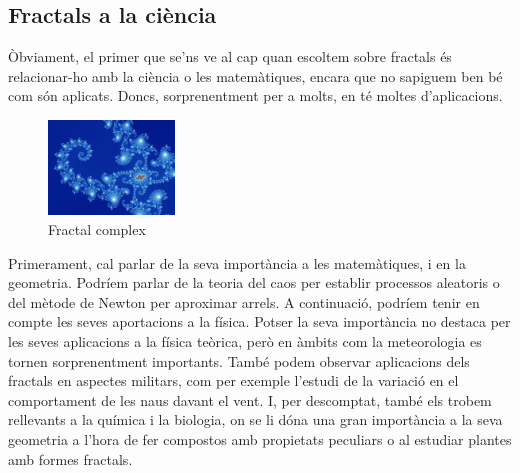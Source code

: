 \documentclass[12pt]{report}
\begin{document}
\subsection{Fractals a la ciència}
Òbviament, el primer que se'ns ve al cap quan escoltem sobre fractals és relacionar-ho amb la ciència o les matemàtiques, encara que no sapiguem ben bé com són aplicats. Doncs, sorprenentment per a molts, en té moltes d'aplicacions.
\newline
\begin{figure}
    \includegraphics[width=0.3\textwidth]{ciencia.jpg}
    \caption{Fractal complex}
    \end{figure}
Primerament, cal parlar de la seva importància a les matemàtiques, i en la geometria. Podríem parlar de la teoria del caos per establir processos aleatoris o del mètode de Newton per aproximar arrels.
\newline
A continuació, podríem tenir en compte les seves aportacions a la física. Potser la seva importància no destaca per les seves aplicacions a la física teòrica, però en àmbits com la meteorologia es tornen sorprenentment importants. També podem observar aplicacions dels fractals en aspectes militars, com per exemple l'estudi de la variació en el comportament de les naus davant el vent.
\newline
I, per descomptat, també els trobem rellevants a la química i la biologia, on se li dóna una gran importància a la seva geometria a l'hora de fer compostos amb propietats peculiars o al estudiar plantes amb formes fractals.
\newline
\newline
\newline
\end{document}
